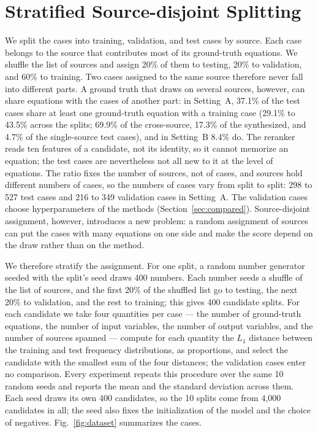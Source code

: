 \section{Stratified Source-disjoint Splitting}
\label{sec:split}

We split the cases into training, validation, and test cases by source. Each case belongs to the
source that contributes most of its ground-truth equations. We shuffle the list of sources and
assign 20\% of them to testing, 20\% to validation, and 60\% to training. Two cases assigned to the
same source therefore never fall into different parts. A ground truth that draws on several
sources, however, can share equations with the cases of another part: in Setting~A, 37.1\% of the
test cases share at least one ground-truth equation with a training case (29.1\% to 43.5\% across
the splits; 69.9\% of the cross-source, 17.3\% of the synthesized, and 4.7\% of the single-source
test cases), and in Setting~B 8.4\% do. The reranker reads ten features of a candidate, not its
identity, so it cannot memorize an equation; the test cases are nevertheless not all new to it at
the level of equations.
The ratio fixes the
number of sources, not of cases, and sources hold different numbers of cases, so the numbers of
cases vary from split to split: 298 to 527 test cases and 216 to 349 validation cases in
Setting~A. The validation cases choose hyperparameters of the methods (Section~\ref{sec:compared}).
Source-disjoint assignment, however, introduces a new problem: a random assignment of sources can
put the cases with many equations on one side and make the score depend on the draw rather than on
the method.

We therefore stratify the assignment. For one split, a random number generator seeded with the
split's seed draws 400 numbers. Each number seeds a shuffle of the list of sources, and the first
20\% of the shuffled list go to testing, the next 20\% to validation, and the rest to training; this gives 400
candidate splits. For each candidate we take four quantities per case --- the number of
ground-truth equations, the number of input variables, the number of output variables, and the
number of sources spanned --- compute for each quantity the $L_1$ distance between the training and
test frequency distributions, as proportions, and select the candidate with the smallest sum of the
four distances; the validation cases enter no comparison. Every experiment repeats this procedure
over the same 10 random seeds and reports the mean and the standard deviation across them. Each
seed draws its own 400 candidates, so the 10 splits come from 4,000 candidates in all; the seed
also fixes the initialization of the model and the choice of negatives. Fig.~\ref{fig:dataset} summarizes the cases.

